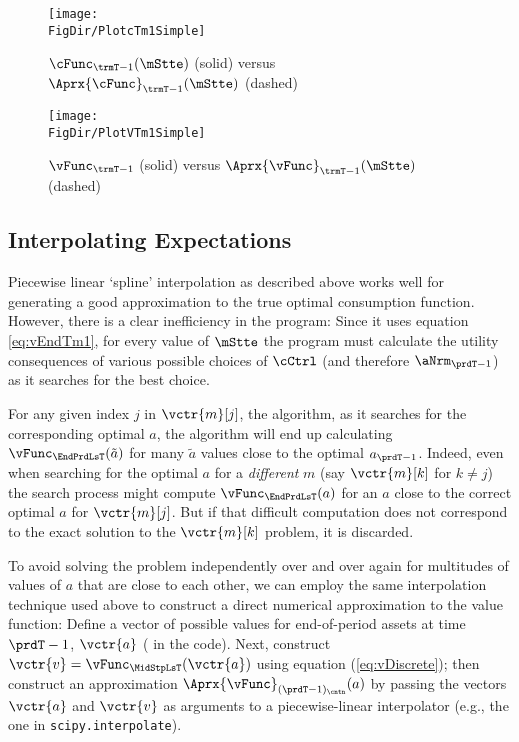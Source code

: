 \documentclass[\econtexRoot/SolvingMicroDSOPs]{subfiles}
\begin{document}
\hypertarget{PlotcTm1Simple}{}
\begin{figure}
  \centerline{\texttt{[image: \\FigDir/PlotcTm1Simple]}}
  \caption{$\cFunc_{\trmT-1}(\mStte)$ (solid) versus $\Aprx{\cFunc}_{\trmT-1}(\mStte)$ (dashed)}
  \label{fig:PlotcTm1Simple}
\end{figure}

\hypertarget{PlotvTm1Simple}{}
\begin{figure}
  \centerline{\texttt{[image: \\FigDir/PlotVTm1Simple]}}
  \caption{$\vFunc_{\trmT-1}$ (solid) versus $\Aprx{\vFunc}_{\trmT-1}(\mStte)$ (dashed)}
  \label{fig:PlotVTm1Simple}
\end{figure}


\hypertarget{interpolating-expectations}{}
\subsection{Interpolating Expectations}


Piecewise linear `spline' interpolation as described above works well for generating a good approximation to the true optimal consumption function. However, there is a clear inefficiency in the program: Since it uses equation \eqref{eq:vEndTm1}, for every value of $\mStte$ the program must calculate the utility consequences of various possible choices of $\cCtrl$ (and therefore $\aNrm_{\prdT-1}$) as it searches for the best choice.

For any given index $j$ in $\vctr{m}[j]$, the algorithm, as it searches for the corresponding optimal $a$, the algorithm will end up  calculating $\vFunc_{\EndPrdLsT}(\tilde{a})$ for many $\tilde{a}$ values close to the optimal $a_{\prdT-1}$.  Indeed, even when searching for the optimal $a$ for a \emph{different} $m$ (say $\vctr{m}[k]$ for $k \neq j$) the search process might compute $\vFunc_{\EndPrdLsT}(a)$ for an $a$ close to the correct optimal $a$ for $\vctr{m}[j]$. But if that difficult computation does not correspond to the exact solution to the $\vctr{m}[k]$ problem, it is discarded.  

To avoid solving the problem independently over and over again for multitudes of values of $a$ that are close to each other, we can employ the same interpolation technique used above to construct a direct numerical approximation to the value function: Define a vector of possible values for end-of-period assets at time $\prdT-1$, $\vctr{a}$ ( in the code). Next, construct $\vctr{v} = \vFunc_{\MidStpLsT}(\vctr{a})$ using equation (\ref{eq:vDiscrete}); then construct an approximation $\Aprx{\vFunc}_{({\prdT-1})_\cntn}(a)$ by passing the vectors $\vctr{a}$ and $\vctr{v}$ as arguments to a piecewise-linear interpolator (e.g., the one in \texttt{scipy.interpolate}).%
\end{document}

